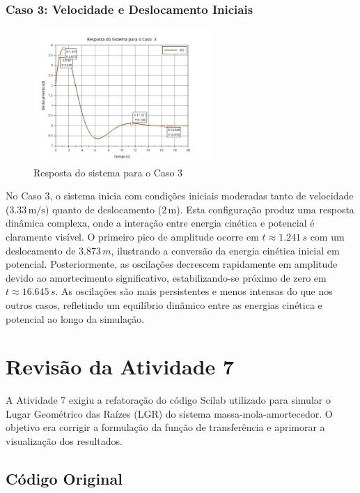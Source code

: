 \documentclass{article}
\begin{document}
\subsubsection{Caso 3: Velocidade e Deslocamento Iniciais}
\begin{figure}[H]
    \centering
    \includegraphics[width=0.6\textwidth]{atividades/1-atividade/assets/caso3.png}
    \caption{Resposta do sistema para o Caso 3}
\end{figure}
No Caso 3, o sistema inicia com condições iniciais moderadas tanto de velocidade (\(3.33 \, \text{m/s}\)) quanto de deslocamento (\(2 \, \text{m}\)). Esta configuração produz uma resposta dinâmica complexa, onde a interação entre energia cinética e potencial é claramente visível. O primeiro pico de amplitude ocorre em \(t \approx 1.241 \, s\) com um deslocamento de \(3.873 \, m\), ilustrando a conversão da energia cinética inicial em potencial. Posteriormente, as oscilações decrescem rapidamente em amplitude devido ao amortecimento significativo, estabilizando-se próximo de zero em \(t \approx 16.645 \, s\). As oscilações são mais persistentes e menos intensas do que nos outros casos, refletindo um equilíbrio dinâmico entre as energias cinética e potencial ao longo da simulação.


\section{Revisão da Atividade 7}

A Atividade 7 exigiu a refatoração do código Scilab utilizado para simular o Lugar Geométrico das Raízes (LGR) do sistema massa-mola-amortecedor. O objetivo era corrigir a formulação da função de transferência e aprimorar a visualização dos resultados.

\subsection{Código Original}
\end{document}
